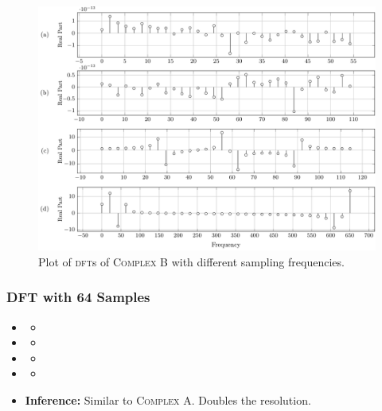 \documentclass[../../course]{subfiles}
\begin{document}
\begin{figure} [H]
    \centering
     {
        \includegraphics[height = 0.8\textheight] {tikzpics/plotDftComplexB32.pdf}
    }
     {Plot of \textsc{dft}s of \textsc{Complex B} with different sampling frequencies.}
    \label{plt:dftCplxB32}
\end{figure}

\subsubsection{DFT with 64 Samples}

\begin{itemize} [label=]

    \item \sampFreqMuchLess
        \begin{itemize} [label=]
            \item
        \end{itemize}

    \item \sampFreqNorm
        \begin{itemize} [label=]
            \item
        \end{itemize}

    \item \sampFreqSligGreat
        \begin{itemize} [label=]
            \item
        \end{itemize}

    \item \sampFreqMuchGreat
        \begin{itemize} [label=]
            \item
        \end{itemize}

    \item \textbf{Inference:} Similar to \textsc{Complex A}. Doubles the resolution.

\end{itemize}
\end{document}
